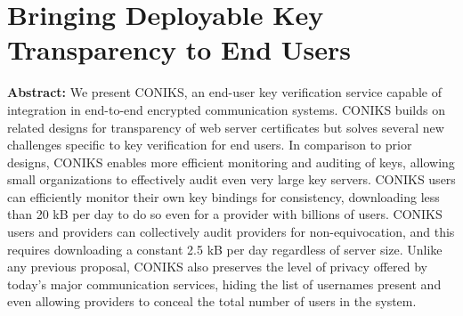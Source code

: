 \section{Bringing Deployable Key Transparency to End Users }

\textbf{Abstract:} 
We present CONIKS, an end-user key verification service capable of integration in end-to-end encrypted communication systems. CONIKS builds on related designs for transparency of web server certificates but solves several new challenges specific to key verification for end users. In comparison to prior designs, CONIKS enables more efficient monitoring and auditing of keys, allowing small organizations to effectively audit even very large key servers. CONIKS users can efficiently monitor their own key bindings for consistency, downloading less than 20 kB per day to do so even for a provider with billions of users. CONIKS users and providers can collectively audit providers for non-equivocation, and this requires downloading a constant 2.5 kB per day regardless of server size. Unlike any previous proposal, CONIKS also preserves the level of privacy offered by today’s major communication services, hiding the list of usernames present and even allowing providers to conceal the total number of users in the system.
